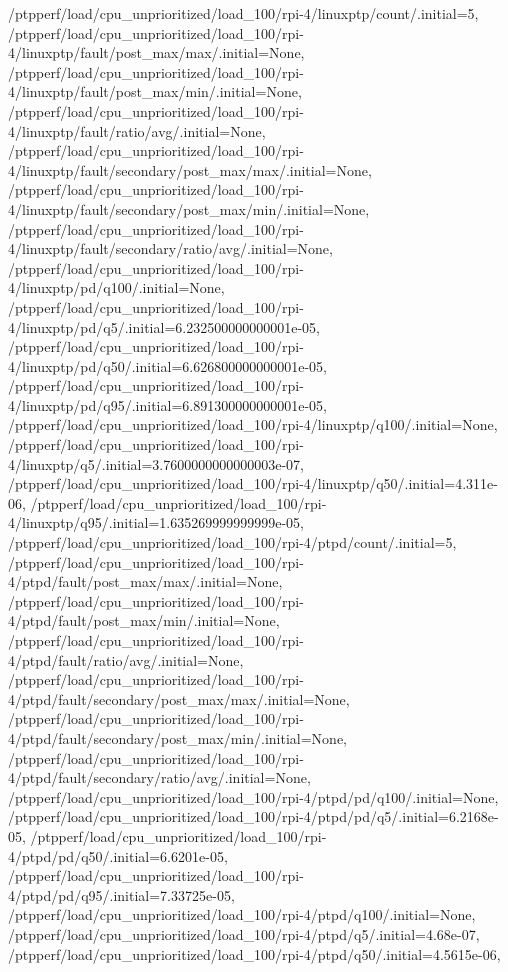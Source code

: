 {    /ptpperf/load/cpu_unprioritized/load_100/rpi-4/linuxptp/count/.initial=5,
    /ptpperf/load/cpu_unprioritized/load_100/rpi-4/linuxptp/fault/post_max/max/.initial=None,
    /ptpperf/load/cpu_unprioritized/load_100/rpi-4/linuxptp/fault/post_max/min/.initial=None,
    /ptpperf/load/cpu_unprioritized/load_100/rpi-4/linuxptp/fault/ratio/avg/.initial=None,
    /ptpperf/load/cpu_unprioritized/load_100/rpi-4/linuxptp/fault/secondary/post_max/max/.initial=None,
    /ptpperf/load/cpu_unprioritized/load_100/rpi-4/linuxptp/fault/secondary/post_max/min/.initial=None,
    /ptpperf/load/cpu_unprioritized/load_100/rpi-4/linuxptp/fault/secondary/ratio/avg/.initial=None,
    /ptpperf/load/cpu_unprioritized/load_100/rpi-4/linuxptp/pd/q100/.initial=None,
    /ptpperf/load/cpu_unprioritized/load_100/rpi-4/linuxptp/pd/q5/.initial=6.232500000000001e-05,
    /ptpperf/load/cpu_unprioritized/load_100/rpi-4/linuxptp/pd/q50/.initial=6.626800000000001e-05,
    /ptpperf/load/cpu_unprioritized/load_100/rpi-4/linuxptp/pd/q95/.initial=6.891300000000001e-05,
    /ptpperf/load/cpu_unprioritized/load_100/rpi-4/linuxptp/q100/.initial=None,
    /ptpperf/load/cpu_unprioritized/load_100/rpi-4/linuxptp/q5/.initial=3.7600000000000003e-07,
    /ptpperf/load/cpu_unprioritized/load_100/rpi-4/linuxptp/q50/.initial=4.311e-06,
    /ptpperf/load/cpu_unprioritized/load_100/rpi-4/linuxptp/q95/.initial=1.635269999999999e-05,
    /ptpperf/load/cpu_unprioritized/load_100/rpi-4/ptpd/count/.initial=5,
    /ptpperf/load/cpu_unprioritized/load_100/rpi-4/ptpd/fault/post_max/max/.initial=None,
    /ptpperf/load/cpu_unprioritized/load_100/rpi-4/ptpd/fault/post_max/min/.initial=None,
    /ptpperf/load/cpu_unprioritized/load_100/rpi-4/ptpd/fault/ratio/avg/.initial=None,
    /ptpperf/load/cpu_unprioritized/load_100/rpi-4/ptpd/fault/secondary/post_max/max/.initial=None,
    /ptpperf/load/cpu_unprioritized/load_100/rpi-4/ptpd/fault/secondary/post_max/min/.initial=None,
    /ptpperf/load/cpu_unprioritized/load_100/rpi-4/ptpd/fault/secondary/ratio/avg/.initial=None,
    /ptpperf/load/cpu_unprioritized/load_100/rpi-4/ptpd/pd/q100/.initial=None,
    /ptpperf/load/cpu_unprioritized/load_100/rpi-4/ptpd/pd/q5/.initial=6.2168e-05,
    /ptpperf/load/cpu_unprioritized/load_100/rpi-4/ptpd/pd/q50/.initial=6.6201e-05,
    /ptpperf/load/cpu_unprioritized/load_100/rpi-4/ptpd/pd/q95/.initial=7.33725e-05,
    /ptpperf/load/cpu_unprioritized/load_100/rpi-4/ptpd/q100/.initial=None,
    /ptpperf/load/cpu_unprioritized/load_100/rpi-4/ptpd/q5/.initial=4.68e-07,
    /ptpperf/load/cpu_unprioritized/load_100/rpi-4/ptpd/q50/.initial=4.5615e-06,
}
